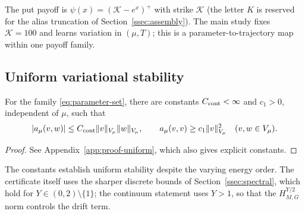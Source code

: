 \documentclass[hidelinks]{siamart251216}
\begin{document}
The put payoff is $\psi(x)=(\mathcal K-e^x)^+$ with strike $\mathcal K$ (the letter $K$ is reserved
for the alias truncation of Section~\ref{ssec:assembly}). The main study fixes $\mathcal K=100$ and
learns variation in $(\mu,T)$; this is a parameter-to-trajectory map within
one payoff family.

\subsection{Uniform variational stability}
\label{ssec:uniform}
\begin{theorem}
\label{thm:uniform-coercivity}
For the family \eqref{eq:parameter-set}, there are constants
$C_{\rm cont}<\infty$ and $c_1>0$, independent of $\mu$, such that
\begin{equation}
 |a_\mu(v,w)|\le C_{\rm cont}\|v\|_{V_\mu}\|w\|_{V_\mu},
 \qquad a_\mu(v,v)\ge c_1\|v\|_{V_\mu}^2
 \quad(v,w\in V_\mu).
 \label{eq:uniform-coercivity}
\end{equation}
\end{theorem}
\begin{proof}
See Appendix~\ref{app:proof-uniform}, which also gives explicit constants.
\end{proof}
The constants establish uniform stability despite the varying energy order.  The certificate
itself uses the sharper discrete bounds of Section~\ref{ssec:spectral}, which hold for
$Y\in(0,2)\setminus\{1\}$; the continuum statement uses $Y>1$, so that the $H^{Y/2}_{M,G}$ norm
controls the drift term.

\end{document}
